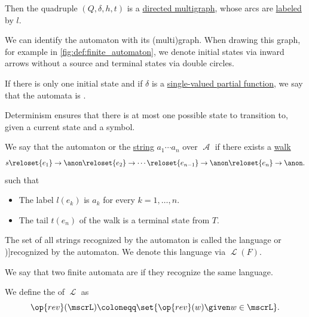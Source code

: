 \begin{definition}
\begin{thmenum}
    Then the quadruple \( (Q, \delta, h, t) \) is a \hyperref[def:directed_multigraph]{directed multigraph}, whose arcs are \hyperref[def:labeled_set]{labeled} by \( l \).

    We can identify the automaton with its (multi)graph. When drawing this graph, for example in \cref{fig:def:finite_automaton}, we denote initial states via inward arrows without a source and terminal states via double circles.

     If there is only one initial state and if \( \delta \) is a \hyperref[def:partial_function]{single-valued partial function}, we say that the automata is .

    Determinism ensures that there is at most one possible state to transition to, given a current state and a symbol.

     We say that the automaton  or  the \hyperref[def:formal_language/string]{string} \( a_1 \cdots a_n \) over \( \mscrA \) if there exists a \hyperref[def:graph_walk/directed]{walk}
    \begin{equation*}
      s \reloset {e_1} \to \anon \reloset {e_2} \to \cdots \reloset {e_{n-1}} \to \anon \reloset {e_n} \to \anon.
    \end{equation*}
    such that
    \begin{itemize}
      \item The label \( l(e_k) \) is \( a_k \) for every \( k = 1, \ldots, n \).
      \item The tail \( t(e_n) \) of the walk is a terminal state from \( T \).
    \end{itemize}

     The set of all strings recognized by the automaton is called the language  or \term[ru=(язык) распознается (автоматом) (\cite[45]{Гладкий1973ГрамматикиИЯзыки})]{recognized} by the automaton. We denote this language via \( \mscrL(F) \).

     We say that two finite automata are  if they recognize the same language.
  \end{thmenum}
\end{definition}

\begin{definition}\label{def:reverse_language}\mimprovised
  We define the  of \( \mscrL \) as
  \begin{equation*}
    \op{rev}(\mscrL) \coloneqq \set{ \op{rev}(w) \given w \in \mscrL }.
  \end{equation*}
\end{definition}

